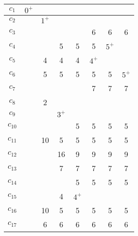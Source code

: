 \documentclass[12pt, a4paper] {ncc}
\begin{document}
\begin{enumerate}
\begin{tabular} {|c|c|c|c|c|c|c|c|}
    \hline
    $c_{1}$  &$0^+$&      &     &     &     &     &      \\ \hline
    $c_{2}$  & \z  &$1^+$ &     &     &     &     &      \\ \hline
    $c_{3}$  & \z  & \z   & \z  &\z   & 6   &  6  &  6   \\ \hline
    $c_{4}$  & \z  & \z   & 5   & 5   & 5   &$5^+$&        \\ \hline
    $c_{5}$  & \z  & 4    & 4   & 4   &$4^+$&     &         \\ \hline
    $c_{6}$  & \z  & 5    & 5   & 5   & 5   &  5  &$5^+$     \\ \hline
    $c_{7}$  & \z  & \z   & \z  & \z  & 7   &  7  &  7   \\ \hline
    $c_{8}$  & \z  & 2    & \z  & \z  & \z  &  \z & \z   \\ \hline
    $c_{9}$  & \z  & \z   &$3^+$&     &     &     &      \\ \hline
    $c_{10}$ & \z  & \z   & \z  & 5   & 5   &  5  &  5   \\ \hline
    $c_{11}$ & \z  & 10   &  5  & 5   & 5   &  5  &  5   \\ \hline
    $c_{12}$ & \z  & \z   & 16  & 9   & 9   &  9  &  9   \\ \hline
    $c_{13}$ & \z  & \z   & 7   & 7   & 7   &  7  &  7   \\ \hline
    $c_{14}$ & \z  & \z   & \z  & 5   & 5   &  5  &  5   \\ \hline
    $c_{15}$ & \z  & \z   & 4   &$4^+$&     &     &      \\ \hline
    $c_{16}$ & \z  & 10   & 5   & 5   & 5   &  5  &  5   \\ \hline
    $c_{17}$ & \z  & 6    & 6   & 6   & 6   &  6  &  6   \\ \hline 
\end{tabular}


\end{enumerate}
\end{document}

